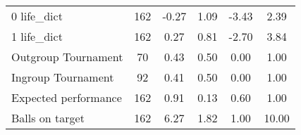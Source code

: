 {\begin{tabular}{l*{1}{ccccc}}
0 life\_dict         &         162&       -0.27&        1.09&       -3.43&        2.39\\
1 life\_dict         &         162&        0.27&        0.81&       -2.70&        3.84\\
Outgroup Tournament &          70&        0.43&        0.50&        0.00&        1.00\\
Ingroup Tournament  &          92&        0.41&        0.50&        0.00&        1.00\\
Expected performance&         162&        0.91&        0.13&        0.60&        1.00\\
Balls on target     &         162&        6.27&        1.82&        1.00&       10.00\\
\hline\hline
\end{tabular}
}
